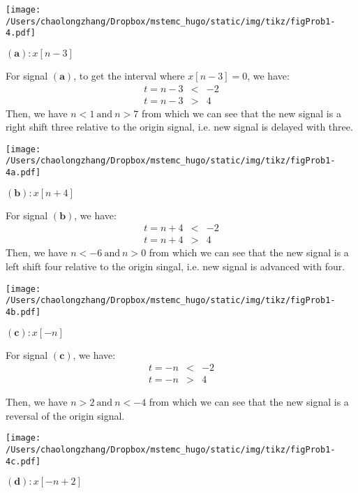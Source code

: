 \documentclass[koma,a4paper,utopia,12pt,listings-color,microtype,paralist,colorlinks,urlcolor=red]{org-article}
\begin{document}
\begin{center}
\texttt{[image: /Users/chaolongzhang/Dropbox/mstemc\_hugo/static/img/tikz/figProb1-4.pdf]}
\end{center}


\(\mathbf{(a)}:x[n-3]\)

For signal \(\mathbf{(a)}\), to get the interval where \(x[n-3] = 0\), we have:
\begin{eqnarray*}
  t=n-3 &<& -2 \\
  t=n-3 &>& 4
\end{eqnarray*}
 Then, we have \(n < 1 \ \mathrm{and} \ n > 7\) from which we can see that
the new signal is a right shift three relative to the origin signal, i.e. new
signal is delayed with three.


\begin{center}
\texttt{[image: /Users/chaolongzhang/Dropbox/mstemc\_hugo/static/img/tikz/figProb1-4a.pdf]}
\end{center}

\(\mathbf{(b)}:x[n+4]\)

For signal \(\mathbf{(b)}\), we have:
\begin{eqnarray*}
t=n+4&<&-2 \\
t=n+4&>&4
\end{eqnarray*}
Then, we have \(n<-6\ \mathrm{and}\ n>0\) from which we can see that the new
signal is a left shift four relative to the origin singal, i.e. new
signal is advanced with four.

\begin{center}
\texttt{[image: /Users/chaolongzhang/Dropbox/mstemc\_hugo/static/img/tikz/figProb1-4b.pdf]}
\end{center}


\(\mathbf{(c)}: x[-n]\)

For signal \(\mathbf{( c )}\), we have:
\begin{eqnarray*}
t=-n&<&-2 \\
t=-n&>&4
\end{eqnarray*}

Then, we have \(n>2\ \mathrm{and} \ n<-4\) from which we can see that the new
signal is a reversal of the origin signal.

\begin{center}
\texttt{[image: /Users/chaolongzhang/Dropbox/mstemc\_hugo/static/img/tikz/figProb1-4c.pdf]}
\end{center}


\(\mathbf{(d)}: x[-n+2]\)
\end{document}
